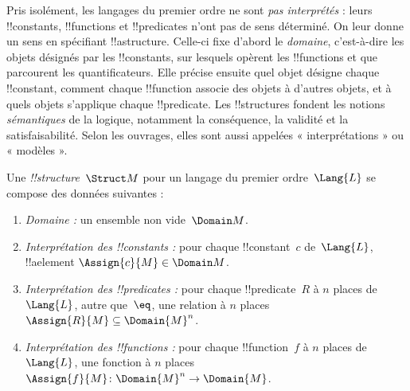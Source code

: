 \documentclass[../../../include/open-logic-section]{subfiles}
\begin{document}


\begin{explain}
Pris isolément, les langages du premier ordre ne sont \emph{pas
interprétés} : leurs !!{constant}s, !!{function}s et !!{predicate}s
n'ont pas de sens déterminé. On leur donne un sens en spécifiant
!!a{structure}. Celle-ci fixe d'abord le \emph{domaine}, c'est-à-dire
les objets désignés par les !!{constant}s, sur lesquels opèrent les
!!{function}s et que parcourent les quantificateurs. Elle précise
ensuite quel objet désigne chaque !!{constant}, comment chaque
!!{function} associe des objets à d'autres objets, et à quels objets
s'applique chaque !!{predicate}. Les !!{structure}s fondent les
notions \emph{sémantiques} de la logique, notamment la conséquence,
la validité et la satisfaisabilité. Selon les ouvrages, elles sont
aussi appelées « interprétations » ou « modèles ».
\end{explain}

\begin{defn}[!!^{structure}s]
Une \emph{!!{structure}}~$\Struct M$ pour un langage du premier
ordre~$\Lang{L}$ se compose des données suivantes :
\begin{enumerate}
\item \emph{Domaine :} un ensemble non vide~$\Domain M$.
\item \emph{Interprétation des !!{constant}s :} pour chaque
  !!{constant}~$c$ de~$\Lang{L}$, !!a{element}
  $\Assign{c}{M} \in \Domain M$.
\item \emph{Interprétation des !!{predicate}s :} pour chaque
  !!{predicate}~$R$ à $n$ places de~$\Lang{L}$, autre que~$\eq$,
  une relation à $n$ places
  $\Assign{R}{M} \subseteq \Domain{M}^n$.
\item \emph{Interprétation des !!{function}s :} pour chaque
  !!{function}~$f$ à $n$ places de~$\Lang{L}$, une fonction à
  $n$ places $\Assign{f}{M} \colon \Domain{M}^n \to \Domain{M}$.
\end{enumerate}
\end{defn}
\end{document}
